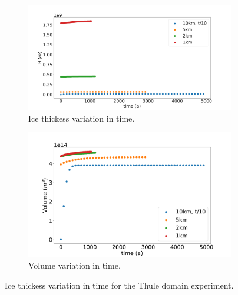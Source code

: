 \documentclass{article}
\begin{document}
\begin{figure}[!h]
	\centering
	\begin{subfigure}{.5\textwidth}
		\centering
		\includegraphics[width=1.1\linewidth]{../fig/H_THULE_full_all_res_vs_time.png}
		\caption{Ice thickess variation in time.}
		\label{H_THULE_VS_TIME}
	\end{subfigure}%
	\begin{subfigure}{.5\textwidth}
	\centering
	\includegraphics[width=1.1\linewidth]{../fig/Volume_THULE_full_all_res_vs_time.png}
	\caption{Volume variation in time.}
	\label{VOLUME_THULE_VS_TIME}
	\end{subfigure}
	\caption{Ice thickess variation in time for the Thule domain experiment.}
	\label{H_THULE_VS_TIME_VS_NODES}
\end{figure}
\end{document}
